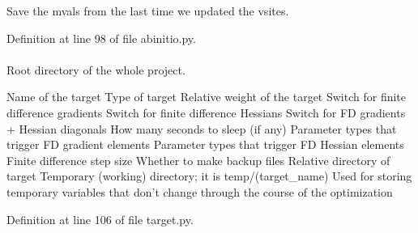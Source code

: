 \-Save the mvals from the last time we updated the vsites. 



\-Definition at line 98 of file abinitio.\-py.

\hypertarget{classforcebalance_1_1target_1_1Target_aede2856573b890cd47054ad36937d6f6}{
\paragraph[{tempdir}]{}}\label{classforcebalance_1_1target_1_1Target_aede2856573b890cd47054ad36937d6f6}


\-Root directory of the whole project. 

\-Name of the target \-Type of target \-Relative weight of the target \-Switch for finite difference gradients \-Switch for finite difference \-Hessians \-Switch for \-F\-D gradients + \-Hessian diagonals \-How many seconds to sleep (if any) \-Parameter types that trigger \-F\-D gradient elements \-Parameter types that trigger \-F\-D \-Hessian elements \-Finite difference step size \-Whether to make backup files \-Relative directory of target \-Temporary (working) directory; it is temp/(target\-\_\-name) \-Used for storing temporary variables that don't change through the course of the optimization 

\-Definition at line 106 of file target.\-py.

\hypertarget{classforcebalance_1_1gmxio_1_1AbInitio__GMX_ac86e5eeee4ed51aad1bb70c186ab69f6}{
\paragraph[{topfnm}]{}}\label{classforcebalance_1_1gmxio_1_1AbInitio__GMX_ac86e5eeee4ed51aad1bb70c186ab69f6}


